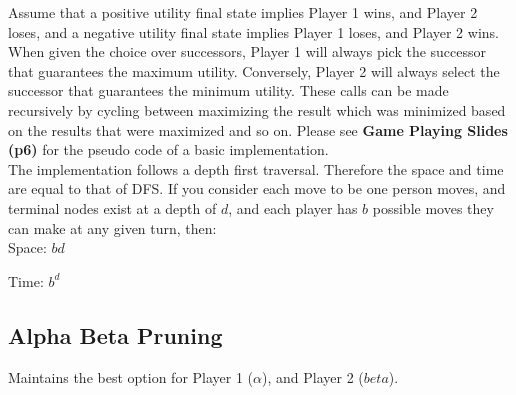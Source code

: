 \documentclass[letterpaper]{article} %
\begin{document}
Assume that a positive utility final state implies Player 1 wins, and Player 2 loses, and a negative utility final state implies Player 1 loses, and Player 2 wins. When given the choice over successors, Player 1 will always pick the successor that guarantees the maximum utility. Conversely, Player 2 will always select the successor that guarantees the minimum utility. These calls can be made recursively by cycling between maximizing the result which was minimized based on the results that were maximized and so on. Please see \textbf{Game Playing Slides (p6)} for the pseudo code of a basic implementation.\\

The implementation follows a depth first traversal. Therefore the space and time are equal to that of DFS. If you consider each move to be one person moves, and terminal nodes exist at a depth of $d$, and each player has $b$ possible moves they can make at any given turn, then:\\

Space: $bd$

Time: $b^d$

\subsection{Alpha Beta Pruning}

Maintains the best option for Player 1 ($\alpha$), and Player 2 ($beta$).
\end{document}
